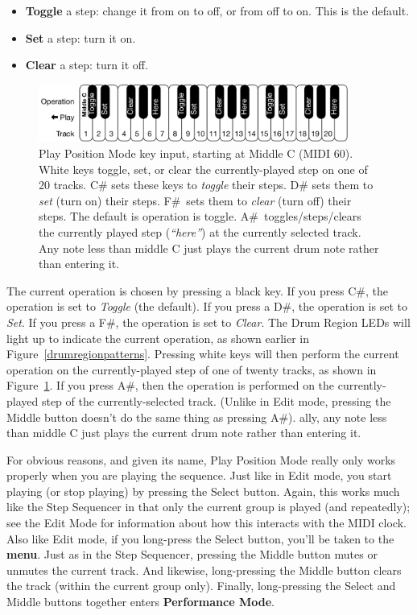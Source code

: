 \documentclass{article}
\begin{document}
\enlargethispage{1em}

\begin{itemize}
\item {\bf Toggle} a step: change it from on to off, or from off to on.  This is the default.
\item {\bf Set} a step: turn it on.
\item {\bf Clear} a step: turn it off.
\end{itemize}

\begin{figure}
\vspace{-1em}
\hspace{\fill}\includegraphics[width=4in]{PlayPositionModeKeys}
\vspace{-1em}
\caption{\small Play Position Mode key input, starting at Middle C (MIDI 60).  White keys toggle, set, or clear the currently-played step on one of 20 tracks.  C\# sets these keys to {\it toggle} their steps.  D\# sets them to {\it set} (turn on) their steps.  F\#~sets them to {\it clear} (turn off) their steps.  The default is operation is toggle.  A\#~toggles/steps/clears the currently played step ({\it ``here''}) at the currently selected track.  Any note less than middle C just plays the current drum note rather than entering it. }
\label{playpositionmodekeys}
\end{figure}

The current operation is chosen by  pressing a black key.  If you press C\#, the operation is set to {\it Toggle} (the default).  If you press a D\#, the operation is set to {\it Set}.  If you press a F\#, the operation is set to {\it Clear}.  The Drum Region LEDs will light up to indicate the current operation, as shown earlier in Figure~\ref{drumregionpatterns}.  Pressing white keys will then perform the current operation on the currently-played step of one of twenty tracks, as shown in Figure~\ref{playpositionmodekeys}.  If you press A\#, then the operation is performed on the currently-played step of the currently-selected track.  (Unlike in Edit mode, pressing the Middle button doesn't do the same thing as pressing A\#).  ally, any note less than middle C just plays the current drum note rather than entering it.

For obvious reasons, and given its name, Play Position Mode really only works properly when you are playing the sequence.  Just like in Edit mode, you start playing (or stop playing) by pressing the Select button.  Again, this works much like the Step Sequencer in that only the current group is played (and repeatedly); see the Edit Mode for information about how this interacts with the MIDI clock.   Also like Edit mode, if you long-press the Select button, you'll be taken to the {\bf menu}.    Just as in the Step Sequencer, pressing the Middle button mutes or unmutes the current track.    And likewise, long-pressing the Middle button clears the track (within the current group only).  Finally, long-pressing the Select and Middle buttons together enters {\bf Performance Mode}.
\end{document}
